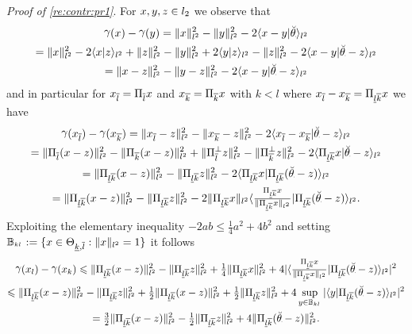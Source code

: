 \begin{pro}
\textit{Proof of \eqref{re:contr:pr1}}. For $x,y,z\in\lp[2]$ we observe that
\begin{multline*}
\contr[](x)-\contr[](y)%
=\Vnormlp{x}^2-\Vnormlp{y}^2-2\Vskalarlp{x-y\vert\dxdfPr[]}\\
=\Vnormlp{x}^2-2\Vskalarlp{x\vert z}+\Vnormlp{z}^2-\Vnormlp{y}^2+2\Vskalarlp{y\vert z}-\Vnormlp{z}^2-2\Vskalarlp{x-y\vert\dxdfPr[]-z}\\
= \Vnormlp{x-z}^2-\Vnormlp{y-z}^2-2\Vskalarlp{x-y\vert\dxdfPr[]-z}
\end{multline*}
and in particular for $x_{\overline{l}}=\dProj{l}{}x$ and $x_{\overline{k}}=\dProj{k}{}x$ with $k<l$
where $x_{\overline{l}}-x_{\overline{k}}=\dProj{k}{l}x$ we have
\begin{multline}\label{scd:le:op:pr:e1}
 \contr[](x_{\overline{l}})-\contr[](x_{\overline{k}})
=
\Vnormlp{x_{\overline{l}}-z}^2-\Vnormlp{x_{\overline{k}}-z}^2-2\Vskalarlp{x_{\overline{l}}-x_{\overline{k}}\vert \dxdfPr[]-z}\\
=\Vnormlp{\dProj{l}{}(x-z)}^2-\Vnormlp{\dProj{k}{}(x-z)}^2+
\Vnormlp{\dProjC{l}{}z}^2-\Vnormlp{\dProjC{k}{}z}^2
-2\Vskalarlp{\dProj{k}{l}x\vert \dxdfPr[]-z}\\
=\Vnormlp{\dProj{k}{l}(x-z)}^2-
\Vnormlp{\dProj{k}{l}z}^2-2\Vskalarlp{\dProj{k}{l}x\vert \dProj{k}{l}(\dxdfPr[]-z)}\\
=\Vnormlp{\dProj{k}{l}(x-z)}^2-
 \Vnormlp{\dProj{k}{l}z}^2-2\Vnormlp{\dProj{k}{l}x}\Vskalarlp{\tfrac{\dProj{k}{l}x}{\Vnormlp{\dProj{k}{l}x}}\vert \dProj{k}{l}(\dxdfPr[]-z)}.
\end{multline}
Exploiting the elementary inequality $-2ab\leq \tfrac{1}{4}a^2+4b^2$
and setting $\dmBaH{k}{l}:=\{x\in\dmHiH{k}{l}:\Vnormlp{x}=1\}$
it follows 
\begin{multline*}
 \contr[](x_l)-\contr[](x_k)
\leq \Vnormlp{\dProj{k}{l}(x-z)}^2-
\Vnormlp{\dProj{k}{l}z}^2+ \tfrac{1}{4}\Vnormlp{\dProj{k}{l}x}^2 +
4|\Vskalarlp{\tfrac{\dProj{k}{l}x}{\Vnormlp{\dProj{k}{l}x}}\vert \dProj{k}{l}(\dxdfPr[]-z)}|^2\\
\leq \Vnormlp{\dProj{k}{l}(x-z)}^2-
\Vnormlp{\dProj{k}{l}z}^2+ \tfrac{1}{2}\Vnormlp{\dProj{k}{l}(x-z)}^2+ \tfrac{1}{2}\Vnormlp{\dProj{k}{l}z}^2 +
4\sup_{y\in\dmBaH{k}{l}} |\Vskalarlp{y\vert \dProj{k}{l}(\dxdfPr[]-z)}|^2\\
 = \tfrac{3}{2}\Vnormlp{\dProj{k}{l}(x-z)}^2-\tfrac{1}{2}
 \Vnormlp{\dProj{k}{l}z}^2 + 4 \Vnormlp{\dProj{k}{l}(\dxdfPr[]-z)}^2.
\end{multline*}

\end{pro}
